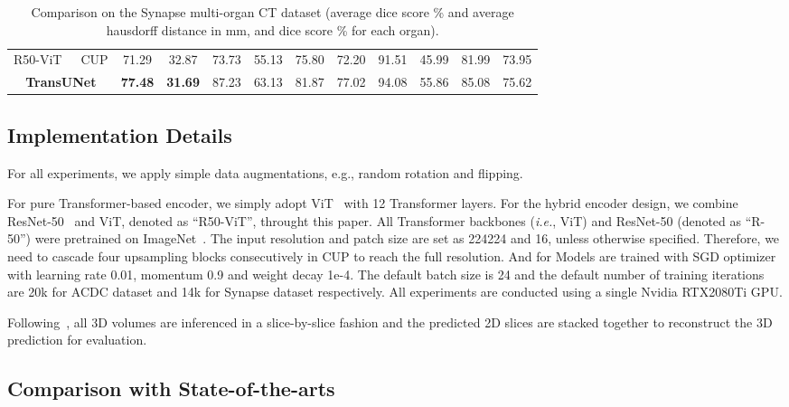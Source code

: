 \documentclass[runningheads]{llncs}
\begin{document}
\begin{table}[]
{\begin{tabular}{cccccccccccc}
R50-ViT~\cite{dosovitskiy2020image}    & CUP              & 71.29        & 32.87        & 73.73      & 55.13          & 75.80         & 72.20         & 91.51       & 45.99        & 81.99      & 73.95        \\
\multicolumn{2}{c}{\textbf{TransUNet}} & \textbf{77.48}        & \textbf{31.69}        & 87.23        & 63.13          & 81.87          & 77.02          & 94.08      & 55.86         & 85.08      & 75.62        \\ 
\hline
\end{tabular}
\vspace{-0.6em}
}
\caption{Comparison on the Synapse multi-organ CT dataset (average dice score \% and average hausdorff distance in mm, and dice score \% for each organ).
}
\label{tab:synapse}
\end{table}

\vspace{-2.5em}
\subsection{Implementation Details}
For all experiments, we apply simple data augmentations, e.g., random rotation and flipping. 

For pure Transformer-based encoder, we simply adopt ViT~\cite{dosovitskiy2020image} with 12 Transformer layers.
For the hybrid encoder design, we combine ResNet-50~\cite{he2016deep} and ViT, denoted as ``R50-ViT'', throught this paper.
All Transformer backbones (\emph{i.e.}, ViT) and ResNet-50 (denoted as ``R-50'') were pretrained on ImageNet~\cite{deng2009imagenet}. 
The input resolution and patch size  are set as 224224 and 16, unless otherwise specified.
Therefore, we need to cascade four  upsampling blocks consecutively in CUP to reach the full resolution.
And for 
Models are trained with SGD optimizer with learning rate 0.01, momentum 0.9 and weight decay 1e-4.
The default batch size is 24 and the default number of training iterations are 20k for ACDC dataset and 14k for Synapse dataset respectively. All experiments are conducted using a single Nvidia RTX2080Ti GPU.

Following~\cite{zhou2017fixed,yu2018recurrent}, all 3D volumes are inferenced in a slice-by-slice fashion and the predicted 2D slices are stacked together to reconstruct the 3D prediction for evaluation.

\subsection{Comparison with State-of-the-arts}
\label{sec:comparison}
\end{document}
